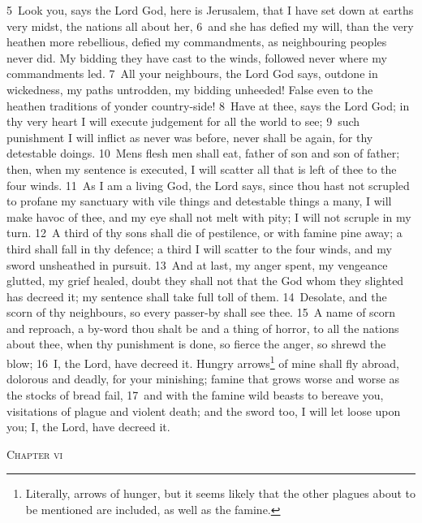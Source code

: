 \documentclass[10pt]{book} %
\begin{document}
\textcolor{benred8}{5}~Look you, says the Lord God, here is Jerusalem, that I have set down at earth\textquotesingle s very midst, the nations all about her, \textcolor{benred8}{6}~and she has defied my will, than the very heathen more rebellious, defied my commandments, as neighbouring peoples never did. My bidding they have cast to the winds, followed never where my commandments led. \textcolor{benred8}{7}~All your neighbours, the Lord God says, outdone in wickedness, my paths untrodden, my bidding unheeded! False even to the heathen traditions of yonder country-side! \textcolor{benred8}{8}~Have at thee, says the Lord God; in thy very heart I will execute judgement for all the world to see; \textcolor{benred8}{9}~such punishment I will inflict as never was before, never shall be again, for thy detestable doings. \textcolor{benred8}{10}~Men\textquotesingle s flesh men shall eat, father of son and son of father; then, when my sentence is executed, I will scatter all that is left of thee to the four winds.
\textcolor{benred8}{11}~As I am a living God, the Lord says, since thou hast not scrupled to profane my sanctuary with vile things and detestable things a many, I will make havoc of thee, and my eye shall not melt with pity; I will not scruple in my turn. \textcolor{benred8}{12}~A third of thy sons shall die of pestilence, or with famine pine away; a third shall fall in thy defence; a third I will scatter to the four winds, and my sword unsheathed in pursuit. \textcolor{benred8}{13}~And at last, my anger spent, my vengeance glutted, my grief healed, doubt they shall not that the God whom they slighted has decreed it; my sentence shall take full toll of them. \textcolor{benred8}{14}~Desolate, and the scorn of thy neighbours, so every passer-by shall see thee. \textcolor{benred8}{15}~A name of scorn and reproach, a by-word thou shalt be and a thing of horror, to all the nations about thee, when thy punishment is done, so fierce the anger, so shrewd the blow; \textcolor{benred8}{16}~I, the Lord, have decreed it. Hungry arrows\footnote[2]{Literally, \textasciigrave arrows of hunger\textquotesingle , but it seems likely that the other plagues about to be mentioned are included, as well as the famine.} of mine shall fly abroad, dolorous and deadly, for your minishing; famine that grows worse and worse as the stocks of bread fail, \textcolor{benred8}{17}~and with the famine wild beasts to bereave you, visitations of plague and violent death; and the sword too, I will let loose upon you; I, the Lord, have decreed it.
\begin{large}\begin{center}\textsc{Chapter vi}\end{center}\end{large}
\end{document}
